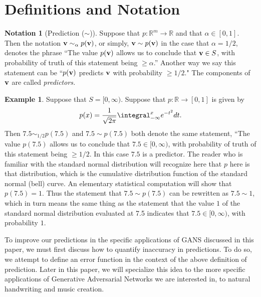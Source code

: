 \documentclass[12pt]{amsart}
\newcommand{\RR}{{\mathbb R}}
\theoremstyle{definition}
\newtheorem{notation}[theorem]{Notation}
\newtheorem{example}[theorem]{Example}
\theoremstyle{remark}
\begin{document}
\section{Definitions and Notation} 

\begin{notation}[Prediction ($\sim$)]
        Suppose that $p:\RR^{m} \to \RR$ and that $\alpha\in[0,1]$.  Then the
        notation ${\bf v} \sim_\alpha p({\bf v})$, or simply, ${\bf v}\sim p({\bf v})$ in the case that $\alpha=1/2$, 
        denotes the phrase ``The value $p({\bf v})$ allows us to conclude that ${\bf v}\in S$, with 
        probability of truth of this statement being $\geq \alpha$.''  Another way we say this statement can be ``$p({\bf v})$ predicts ${\bf v}$ with probability $\geq 1/2$."  The components of ${\bf v}$ are called {\em predictors.} 
\end{notation}

\begin{example}
        Suppose that $S=[0,\infty)$.  Suppose that $p:\RR\rightarrow[0,1]$ is given by
        \begin{equation*}
        p(x)=\frac{1}{\sqrt{2\pi}}\integral_{-\infty}^x e^{-t^2}dt.
        \end{equation*}
        Then $7.5\sim_{1/2}p(7.5)$ and $7.5\sim p(7.5)$ both denote the same statement, ``The value $p(7.5)$ allows us to conclude that $7.5\in [0,\infty)$, with probability of truth of this statement being $\geq 1/2$.  In this case $7.5$ is a predictor.  The reader who is familiar with the standard normal distribution will recognize here that $p$ here is that distribution, which is the cumulative distribution function of the standard normal (bell) curve.  An elementary statistical computation will show that $p(7.5)=1$.  Thus the statement that $7.5\sim p(7.5)$ can be rewritten as $7.5\sim 1$, which in turn means the same thing as the statement that the value $1$ of the standard normal distribution evaluated at 7.5 indicates that $7.5\in[0,\infty)$, with probability $1$.
\end{example}



To improve our predictions in the specific applications of GANS discussed in this
paper, we must first discuss how to quantify inaccuracy in predictions. To do so,
we attempt to define an error function in the context of the above definition of
prediction.  Later in this paper, we will specialize this idea to the more specific 
applications of Generative Adversarial Networks we are interested in, to natural
handwriting and music creation.
\end{document}
